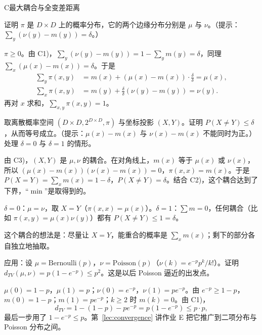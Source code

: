 \begin{probleme}{C}{最大耦合与全变差距离}
\begin{questions}
\[\]
证明 $\pi$ 是 $D\times D$ 上的概率分布，它的两个边缘分布分别是 $\mu$ 与 $\nu$。（提示：$\sum_y(\nu(y)-m(y))=\delta$。）
\begin{solution}
$\pi\geqslant0$。由 C1)，$\sum_y(\nu(y)-m(y))=1-\sum_ym(y)=\delta$，同理 $\sum_x(\mu(x)-m(x))=\delta$。于是
\[
\begin{aligned}
\sum_y\pi(x,y)&=m(x)+(\mu(x)-m(x))\cdot\frac\delta\delta=\mu(x),\\
\sum_x\pi(x,y)&=m(y)+\frac\delta\delta(\nu(y)-m(y))=\nu(y).
\end{aligned}
\]
再对 $x$ 求和，$\sum_{x,y}\pi(x,y)=1$。
\end{solution}
\item 取离散概率空间 $(D\times D,2^{D\times D},\pi)$ 与坐标投影 $(X,Y)$。证明 $P(X\neq Y)\leqslant\delta$，从而等号成立。（提示：$\mu(x)-m(x)$ 与 $\nu(x)-m(x)$ 不能同时为正。）处理 $\delta=0$ 与 $\delta=1$ 的情形。
\begin{solution}
由 C3)，$(X,Y)$ 是 $\mu,\nu$ 的耦合。在对角线上，$m(x)$ 等于 $\mu(x)$ 或 $\nu(x)$，所以 $(\mu(x)-m(x))(\nu(x)-m(x))=0$，$\pi(x,x)=m(x)$。于是 $P(X=Y)=\sum_xm(x)=1-\delta$，$P(X\neq Y)=\delta$。结合 C2)，这个耦合达到了下界，“$\min$”是取得到的。

$\delta=0$：$\mu=\nu$，取 $X=Y$（$\pi(x,x)=\mu(x)$）。$\delta=1$：$\sum m=0$，任何耦合（比如 $\pi(x,y)=\mu(x)\nu(y)$）都有 $P(X\neq Y)\leqslant1=\delta$。

这个耦合的想法是：尽量让 $X=Y$，能重合的概率是 $\sum_xm(x)$；剩下的部分各自独立地抽取。
\end{solution}
\item 应用：设 $\mu=\mathrm{Bernoulli}(p)$，$\nu=\mathrm{Poisson}(p)$（$\nu(k)=e^{-p}p^k/k!$）。证明 $d_{TV}(\mu,\nu)=p(1-e^{-p})\leqslant p^2$。这是以后 Poisson 逼近的出发点。
\begin{solution}
$\mu(0)=1-p$，$\mu(1)=p$；$\nu(0)=e^{-p}$，$\nu(1)=pe^{-p}$。由 $e^{-p}\geqslant1-p$，$m(0)=1-p$；$m(1)=pe^{-p}$；$k\geqslant2$ 时 $m(k)=0$。由 C1)，
\[
d_{TV}=1-(1-p)-pe^{-p}=p(1-e^{-p})\leqslant p\cdot p,
\]
最后一步用了 $1-e^{-p}\leqslant p$。第~\ref{lec:convergence} 讲作业 E 把它推广到二项分布与 Poisson 分布之间。
\end{solution}
\end{questions}
\end{probleme}

